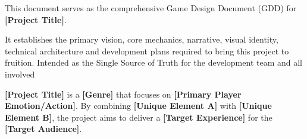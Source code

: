This document serves as the comprehensive Game Design Document (GDD) for \textbf{[Project Title]}.

It establishes the primary vision, core mechanics, narrative, visual identity, technical architecture and development plans required to bring this project to fruition. Intended as the Single Source of Truth for the development team and all involved

\textbf{[Project Title]} is a \textbf{[Genre]} that focuses on \textbf{[Primary Player Emotion/Action]}. By combining \textbf{[Unique Element A]} with \textbf{[Unique Element B]}, the project aims to deliver a \textbf{[Target Experience]} for the \textbf{[Target Audience]}.